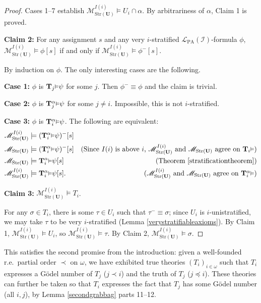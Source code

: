 \documentclass[reqno]{article}
\theoremstyle{definition}
\def\L{\mathscr{L}}
\def\M{\mathscr{M}}
\def\T{\mathbf{T}}
\def\U{\mathbf{U}}
\def\LPA{\L_{\mathrm{PA}}}
\def\indset{\mathcal I}
\renewcommand{\Pr}[1]{\T_{#1}\mbox{\small${\vDash}$}}
\newcommand{\Prr}[2]{\T^{#1}_{#2}\mbox{\small${\vDash}$}}
\newcommand{\case}[1]{\textbf{Case #1:}}
\newcommand{\claim}[1]{\textbf{Claim #1:}}
\newcommand{\str}[1]{\mathrm{Str}(#1)} \newcommand{\Str}[1]{\str{#1}}
\begin{document}
\begin{proof}
\item
Cases 1--7
establish $\M^{I(i)}_{\str{\U}}\models U_i\cap\alpha$.
By arbitrariness of $\alpha$, Claim 1 is proved.

\item
\claim2
For any assignment $s$
and any very $i$-stratified $\LPA(\indset)$-formula $\phi$,
$\M^{I(i)}_{\str{\U}}\models\phi[s]$ if and only if
$\M^{I(i)}_{\str{\U}}\models\phi^-[s]$.

\item
By induction on $\phi$.
The only interesting cases are the following.

\item
\case1
$\phi$ is $\Pr j\psi$ for some $j$.
Then $\phi^-\equiv\phi$ and the claim is trivial.

\item
\case2 $\phi$ is $\Prr \alpha j\psi$ for
some $j\not=i$.  Impossible, this is not $i$-stratified.

\item
\case3
$\phi$ is $\Prr\alpha i\psi$.
The following are equivalent:
\begin{align*}
\M^{I(i)}_{\str{\U}} &\models (\Prr\alpha i\psi)^-[s]\\
\M_{\str{\U}} &\models (\Prr\alpha i\psi)^-[s]
  &\mbox{(Since $I(i)$ is above $i$, $\M^{I(i)}_{\str{\U}}$ and $\M_{\str{\U}}$
  agree on $\Pr i$)}\\
\M_{\str{\U}} &\models \Prr\alpha i\psi[s]
  &\mbox{(Theorem \ref{stratificationtheorem})}\\
\M^{I(i)}_{\str{\U}} &\models \Prr\alpha i\psi[s].
  &\mbox{($\M^{I(i)}_{\str{\U}}$ and $\M_{\str{\U}}$
  agree on $\Prr \alpha i$)}
\end{align*}

\item
\claim3
$\M^{I(i)}_{\str{\U}}\models T_i$.

\item
For any $\sigma\in T_i$,
there is some $\tau\in U_i$ such that $\tau^-\equiv\sigma$;
since $U_i$ is $i$-unistratified, we may take $\tau$ to be very $i$-stratified
(Lemma \ref{verystratifiableaxioms}).
By Claim 1, $\M^{I(i)}_{\str{\U}}\models U_i$,
so $\M^{I(i)}_{\str{\U}}\models\tau$.
By Claim 2, $\M^{I(i)}_{\str{\U}}\models\sigma$.
\end{proof}


This satisfies the second promise from the introduction:
given a well-founded r.e.~partial order $\prec$ on $\omega$,
we have exhibited true theories $(T_i)_{i\in\omega}$ such that $T_i$ expresses 
a G\"odel number of $T_j$ ($j\prec i$) and the truth of $T_j$ ($j\preceq 
i$).  These theories can further be taken so that $T_i$ expresses the fact 
that $T_j$ has some G\"odel number (all $i,j$), by Lemma \ref{secondgrabbag} parts 11--12.
\end{document}

